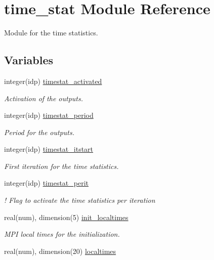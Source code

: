 \hypertarget{namespacetime__stat}{}\section{time\+\_\+stat Module Reference}
\label{namespacetime__stat}


Module for the time statistics.  


\subsection*{Variables}
\begin{DoxyCompactItemize}
\item 
integer(idp) \hyperlink{namespacetime__stat_a1945506276b001ce513b77a643537925}{timestat\+\_\+activated}
\begin{DoxyCompactList}\small\item\em Activation of the outputs. \end{DoxyCompactList}\item 
integer(idp) \hyperlink{namespacetime__stat_ab14608304df879ee0678f16685c5d61e}{timestat\+\_\+period}
\begin{DoxyCompactList}\small\item\em Period for the outputs. \end{DoxyCompactList}\item 
integer(idp) \hyperlink{namespacetime__stat_acb480c360afa0c963ea37a4a3b0cbb88}{timestat\+\_\+itstart}
\begin{DoxyCompactList}\small\item\em First iteration for the time statistics. \end{DoxyCompactList}\item 
integer(idp) \hyperlink{namespacetime__stat_ad186476b25a6b961d4149313b0fc6657}{timestat\+\_\+perit}
\begin{DoxyCompactList}\small\item\em ! Flag to activate the time statistics per iteration \end{DoxyCompactList}\item 
real(num), dimension(5) \hyperlink{namespacetime__stat_a80c25f7e592de42aba002a7756c9976a}{init\+\_\+localtimes}
\begin{DoxyCompactList}\small\item\em M\+PI local times for the initialization. \end{DoxyCompactList}\item 
real(num), dimension(20) \hyperlink{namespacetime__stat_a886a71aaf720ea3a044d9f0bcaf97eca}{localtimes}

\end{DoxyCompactItemize}
